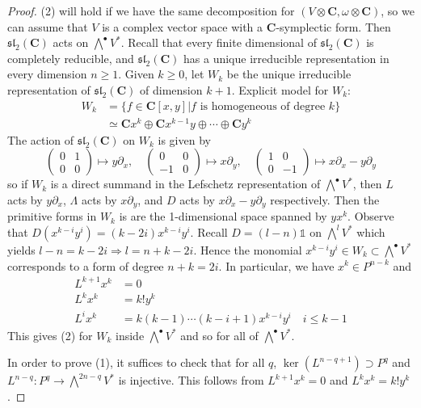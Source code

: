 \documentclass[
11pt, %
letterpaper， %
oneside, %
headinclude,footinclude, %
BCOR5mm, %
]{scrartcl}
\newcommand{\C}{{\mathbf{C}}}
\begin{document}
\begin{proof}
	(2) will hold if we have the same decomposition for $(V\otimes \C, \omega \otimes \C )$, so we can assume that $V$ is a complex vector space with a $\C$-symplectic form. Then $\mathfrak{sl}_2(\C)$ acts on $\bigwedge^{\bullet}V^*$. Recall that every finite dimensional of $\mathfrak{sl}_2(\C)$ is completely reducible, and $\mathfrak{sl}_2(\C)$ has a unique irreducible representation in every dimension $n\ge 1$. Given $k\ge 0$, let $W_k$ be the unique irreducible representation of $\mathfrak{sl}_2(\C)$ of dimension $k+1$. 
	Explicit model for $W_k$:
	\begin{align*}
	 W_k&=\{f\in \C[x,y]| \text{$f$ is homogeneous of degree $k$} \}\\
	 &\simeq \C x^k\oplus \C x^{k-1}y\oplus \cdots \oplus \C y^k
	\end{align*}
	The action of $\mathfrak{sl}_2(\C)$ on $W_k$ is given by
	\begin{equation*}
	\begin{pmatrix} 0 & 1\\ 0 & 0 \end{pmatrix} \mapsto y\partial_x, \quad \begin{pmatrix} 0 & 0\\ -1 & 0 \end{pmatrix}\mapsto x\partial_y, \quad \begin{pmatrix} 1 & 0\\ 0 & -1 \end{pmatrix} \mapsto x\partial_x-y\partial_y
	\end{equation*}
	so if $W_k$ is a direct summand in the Lefschetz representation of $\bigwedge^{\bullet}V^*$, then $L$ acts by $y\partial_x$, $\Lambda$ acts by $x\partial_y$, and $D$ acts by $x\partial_x-y\partial_y$ respectively. Then the primitive forms in $W_k$ is are  the 1-dimensional space spanned by $yx^k$. Observe that $D(x^{k-i}y^i)=(k-2i)x^{k-i}y^i$. Recall $D=(l-n)\mathbb{1}$ on $\bigwedge^{l}V^*$ which yields $l-n=k-2i \Rightarrow l=n+k-2i$. Hence the monomial $x^{k-i}y^i\in W_k\subset \bigwedge^{\bullet}V^*$ corresponds to a form of degree $n+k=2i$. In particular, we have $x^k \in P^{n-k}$ and
	\begin{align*}
	L^{k+1}x^k&=0\\
	L^{k}x^k&=k! y^k\\
	L^{i}x^k&=k(k-1)\cdots(k-i+1) x^{k-i}y^i \quad i\le k-1
	\end{align*}
	This gives (2) for $W_k$ inside $\bigwedge^{\bullet}V^*$ and so for all of $\bigwedge^{\bullet}V^*$.
	
	In order to prove  (1), it suffices to check that for all $q$, $\ker (L^{n-q+1})\supset P^q$ and $L^{n-q}: P^q\to \bigwedge^{2n-q} V^*$ is injective. This follows from $L^{k+1}x^k=0$  and $L^{k}x^k=k! y^k$.
\end{proof}
\end{document}
